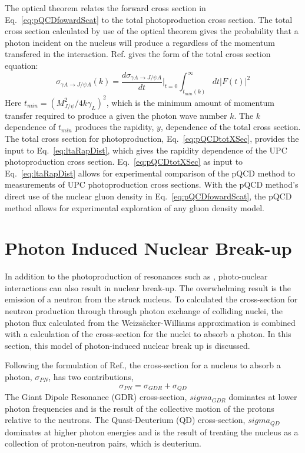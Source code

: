     The optical theorem relates the forward cross section in 
      Eq.~\ref{eq:pQCDfowardScat} to the total photoproduction cross section. 
    The total cross section calculated by use of the optical theorem gives 
      the probability that a photon incident on the nucleus will produce a 
      \JPsi{} regardless of the momentum transfered in the interaction. 
    Ref. \cite{pQCD2011.08} gives the form of the total cross section equation:
    \begin{equation} \label{eq:pQCDtotXSec}
      \sigma_{\gamma A\rightarrow J/\psi A}(k)=
      \frac{d\sigma_{\gamma A\rightarrow J/\psi A}}{dt}\Big|_{t=0}
      \int_{t_{min}(k)}^{\infty}dt|F(t)|^{2}
    \end{equation} 
    Here $t_{min}=(M_{J/\psi}^{2}/4k\gamma_{L})^2$, which is the minimum amount
      of momentum transfer required to produce a \JPsi{} given the photon wave
      number $k$.
    The $k$ dependence of $t_{min}$ produces the rapidity, $y$, dependence of
      the total cross section.
    The total cross section for photoproduction, Eq.~\ref{eq:pQCDtotXSec}, 
      provides the input to Eq.~\ref{eq:ltaRapDist}, 
      which gives the rapidity dependence of the UPC photoproduction cross 
      section. 
    Eq.~\ref{eq:pQCDtotXSec} as input to Eq.~\ref{eq:ltaRapDist} allows for 
      experimental comparison of the pQCD method to measurements of UPC 
      photoproduction cross sections. 
    With the pQCD method's direct use of the nuclear gluon density in 
      Eq.~\ref{eq:pQCDfowardScat}, the pQCD method allows for experimental 
      exploration of any gluon density model. 


  \section{\label{sec:nucBreakUp}Photon Induced Nuclear Break-up}
    In addition to the photoproduction of resonances such as \JPsi{}, 
      photo-nuclear interactions can also result in nuclear break-up. 
    The overwhelming result is the emission of a neutron from the struck 
      nucleus.
    To calculated the cross-section for neutron production through through 
      photon exchange of colliding nuclei, the photon flux calculated from the
      Weizs\"{a}cker-Williams approximation is combined with a calculation of
      the cross-section for the nuclei to absorb a photon. 
    In this section, this model of photon-induced nuclear break up is discussed.

    Following the formulation of Ref.\cite{emPCite4}, the cross-section for a
      nucleus to absorb a photon, $\sigma_{PN}$, has two contributions, 
      \begin{equation}
        \sigma_{PN}=\sigma_{GDR}+\sigma_{QD}
        \label{eq:photoNucDis}
      \end{equation}
    The Giant Dipole Resonance (GDR) cross-section, $sigma_{GDR}$ dominates at 
      lower photon frequencies and is the result of the collective motion of the 
      protons relative to the neutrons.
    The Quasi-Deuterium (QD) cross-section, $sigma_{QD}$ dominates at higher photon energies 
      and is the result of treating the nucleus as a collection of 
      proton-neutron pairs, which is deuterium.

